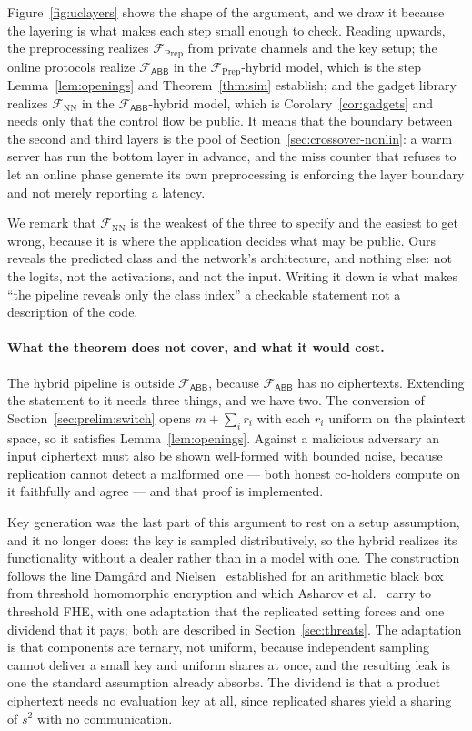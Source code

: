 \documentclass[11pt]{article}
\newcommand{\Fabb}{\mathcal{F}_{\mathsf{ABB}}}
\begin{document}
Figure~\ref{fig:uclayers} shows the shape of the argument, and we draw it because the layering is
what makes each step small enough to check. Reading upwards, the preprocessing realizes
$\mathcal{F}_{\mathrm{Prep}}$ from private channels and the key setup; the online protocols
realize $\Fabb$ in the $\mathcal{F}_{\mathrm{Prep}}$-hybrid model, which is the step
Lemma~\ref{lem:openings} and Theorem~\ref{thm:sim} establish; and the gadget library realizes
$\mathcal{F}_{\mathrm{NN}}$ in the $\Fabb$-hybrid model, which is Corolary~\ref{cor:gadgets} and
needs only that the control flow be public. It means that the boundary between the second and
third layers is the pool of Section~\ref{sec:crossover-nonlin}: a warm server has run the bottom
layer in advance, and the miss counter that refuses to let an online phase generate its own
preprocessing is enforcing the layer boundary and not merely reporting a latency.

We remark that $\mathcal{F}_{\mathrm{NN}}$ is the weakest of the three to specify and the easiest
to get wrong, because it is where the application decides what may be public. Ours reveals the
predicted class and the network's architecture, and nothing else: not the logits, not the
activations, and not the input. Writing it down is what makes ``the pipeline reveals only the
class index'' a checkable statement not a description of the code.

\paragraph{What the theorem does not cover, and what it would cost.} The hybrid pipeline is
outside $\Fabb$, because $\Fabb$ has no ciphertexts. Extending the statement to it needs three
things, and we have two. The conversion of Section~\ref{sec:prelim:switch} opens
$m + \sum_i r_i$ with each $r_i$ uniform on the plaintext space, so it satisfies
Lemma~\ref{lem:openings}. Against a malicious adversary an input ciphertext must also be shown
well-formed with bounded noise, because replication cannot detect a malformed one --- both
honest co-holders compute on it faithfully and agree --- and that proof is implemented.

Key generation was the last part of this argument to rest on a setup assumption, and it no longer
does: the key is sampled distributively, so the hybrid realizes its functionality without a dealer
rather than in a model with one. The construction follows the line Damgård and
Nielsen~\cite{DamgardNielsen} established for an arithmetic black box from threshold homomorphic
encryption and which Asharov et al.~\cite{AsharovMHE} carry to threshold FHE, with one adaptation
that the replicated setting forces and one dividend that it pays; both are described in
Section~\ref{sec:threats}. The adaptation is that components are ternary, not uniform,
because independent sampling cannot deliver a small key and uniform shares at once, and the
resulting leak is one the standard assumption already absorbs. The dividend is that a product
ciphertext needs no evaluation key at all, since replicated shares yield a sharing of $s^2$ with no
communication.
\end{document}
